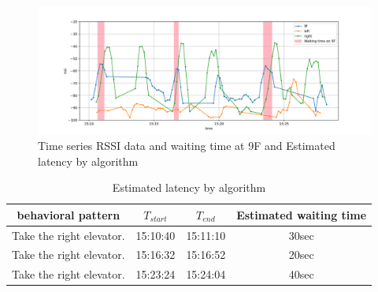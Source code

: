 \begin{figure}[t]
  \centering
  \includegraphics[width=1.0\hsize]{img/ble_rssi_9f_wait_guess.png}
  \caption{Time series RSSI data and waiting time at 9F and Estimated latency by algorithm}
  \label{fig:ble_rssi_9f_wait_quess}
\end{figure}

\begin{table}[ht]
  \caption{Estimated latency by algorithm}
  \label{table:record_table_guess}
  \centering
  \begin{tabular}{c|cc|c}
    \hline
    \textbf{behavioral pattern} & \textbf{$T_{start}$} & \textbf{$T_{end}$} & \textbf{Estimated waiting time} \\ \hline\hline
    Take the right elevator.    & 15:10:40             & 15:11:10           & 30sec                           \\
    Take the right elevator.    & 15:16:32             & 15:16:52           & 20sec                           \\
    Take the right elevator.    & 15:23:24             & 15:24:04           & 40sec                           \\
    \hline
  \end{tabular}
\end{table}
